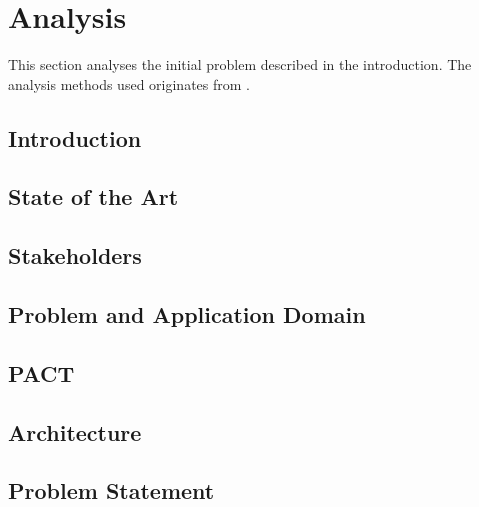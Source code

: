 \chapter{Analysis}

This section analyses the initial problem described in the introduction. The analysis methods used originates from \cite{mathiassen2001objektorienteret}. 

\section{Introduction}

\section{State of the Art}

\section{Stakeholders}

\section{Problem and Application Domain}

\section{PACT}

\section{Architecture}

\section{Problem Statement}

